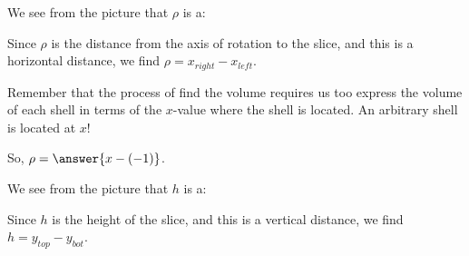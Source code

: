 \documentclass{ximera}
\begin{document}
\begin{exercise}
\begin{exercise}
\begin{image}
  \end{image}
            
 We see from the picture that $\rho$ is a:
 \begin{multipleChoice}
 \end{multipleChoice}           
            
\begin{exercise}
Since $\rho$ is the distance from the axis of rotation to the slice, and this is a horizontal distance, we find $\rho = x_{right}-x_{left}$.
\begin{multipleChoice}
\end{multipleChoice}       

\begin{multipleChoice}
\end{multipleChoice}   

\begin{hint}
Remember that the process of find the volume requires us too express the volume of each shell in terms of the $x$-value where the shell is located.  An arbitrary shell is located at $x$!
\end{hint}

So, $\rho= \answer{x-(-1)}$.
 \end{exercise}
 
  We see from the picture that $h$ is a:
 \begin{multipleChoice}
 \end{multipleChoice}           
 
 \begin{exercise}
Since $h$ is the height of the slice, and this is a vertical distance, we find $h = y_{top}-y_{bot}$.
\begin{multipleChoice}
\end{multipleChoice}       


\end{exercise}
\end{exercise}
\end{exercise}
\end{document}
